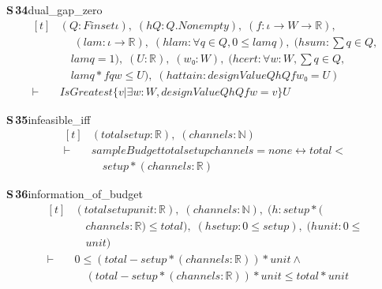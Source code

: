 \documentclass[conference]{IEEEtran}
\theoremstyle{definition}
\newcommand{\lean}[1]{\textsf{\footnotesize #1}}
\begin{document}
\noindent\textbf{S\,34}\quad\lean{dual\_gap\_zero}
{\footnotesize\[ \begin{aligned}[t]
&(\mathit{Q} : \mathit{Finset} \iota ),\; (\mathit{hQ} : \mathit{Q}.\mathit{Nonempty}),\; (\mathit{f} : \iota \to \mathit{W} \to \mathbb{R} ),\\
&\quad \; (\mathit{lam} : \iota \to \mathbb{R} ),\; (\mathit{hlam} : \forall \mathit{q} \in \mathit{Q}, 0 \leq \mathit{lam} \mathit{q}),\; (\mathit{hsum} : \textstyle\sum \mathit{q} \in \mathit{Q},\\
&\quad \mathit{lam} \mathit{q} = 1),\; (\mathit{U} : \mathbb{R} ),\; (\mathit{w₀} : \mathit{W}),\; (\mathit{hcert} : \forall \mathit{w} : \mathit{W}, \textstyle\sum \mathit{q} \in \mathit{Q},\\
&\quad \mathit{lam} \mathit{q} * \mathit{f} \mathit{q} \mathit{w} \leq \mathit{U}),\; (\mathit{hattain} : \mathit{designValue} \mathit{Q} \mathit{hQ} \mathit{f} \mathit{w₀} = \mathit{U})\\
\vdash\;&\mathit{IsGreatest} \{ \mathit{v} | \exists \mathit{w} : \mathit{W}, \mathit{designValue} \mathit{Q} \mathit{hQ} \mathit{f} \mathit{w} = \mathit{v}\} \mathit{U}
\end{aligned} \]}

\noindent\textbf{S\,35}\quad\lean{infeasible\_iff}
{\footnotesize\[ \begin{aligned}[t]
&(\mathit{total} \mathit{setup} : \mathbb{R} ),\; (\mathit{channels} : \mathbb{N} )\\
\vdash\;&\mathit{sampleBudget} \mathit{total} \mathit{setup} \mathit{channels} = \mathit{none} \leftrightarrow \mathit{total} <\\
&\quad \mathit{setup} * (\mathit{channels} : \mathbb{R} )
\end{aligned} \]}

\noindent\textbf{S\,36}\quad\lean{information\_of\_budget}
{\footnotesize\[ \begin{aligned}[t]
&(\mathit{total} \mathit{setup} \mathit{unit} : \mathbb{R} ),\; (\mathit{channels} : \mathbb{N} ),\; (\mathit{h} : \mathit{setup} * (\\
&\quad \mathit{channels} : \mathbb{R} ) \leq \mathit{total}),\; (\mathit{hsetup} : 0 \leq \mathit{setup}),\; (\mathit{hunit} : 0 \leq\\
&\quad \mathit{unit})\\
\vdash\;&0 \leq (\mathit{total} - \mathit{setup} * (\mathit{channels} : \mathbb{R} )) * \mathit{unit} \wedge\\
&\quad (\mathit{total} - \mathit{setup} * (\mathit{channels} : \mathbb{R} )) * \mathit{unit} \leq \mathit{total} * \mathit{unit}
\end{aligned} \]}
\end{document}
